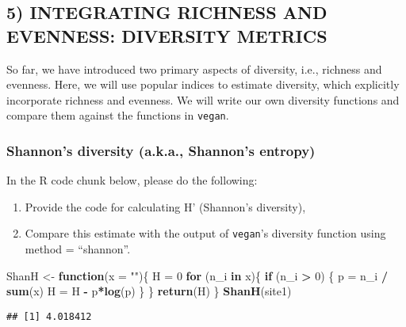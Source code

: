 \documentclass[
]{article}
\newenvironment{Shaded}{\begin{snugshade}}{\end{snugshade}}
\newcommand{\AttributeTok}[1]{\textcolor[rgb]{0.13,0.29,0.53}{#1}}
\newcommand{\ControlFlowTok}[1]{\textcolor[rgb]{0.13,0.29,0.53}{\textbf{#1}}}
\newcommand{\DecValTok}[1]{\textcolor[rgb]{0.00,0.00,0.81}{#1}}
\newcommand{\FunctionTok}[1]{\textcolor[rgb]{0.13,0.29,0.53}{\textbf{#1}}}
\newcommand{\NormalTok}[1]{#1}
\newcommand{\OtherTok}[1]{\textcolor[rgb]{0.56,0.35,0.01}{#1}}
\newcommand{\SpecialCharTok}[1]{\textcolor[rgb]{0.81,0.36,0.00}{\textbf{#1}}}
\newcommand{\StringTok}[1]{\textcolor[rgb]{0.31,0.60,0.02}{#1}}
\begin{document}
\subsection{5) INTEGRATING RICHNESS AND EVENNESS: DIVERSITY
METRICS}\label{integrating-richness-and-evenness-diversity-metrics}

So far, we have introduced two primary aspects of diversity, i.e.,
richness and evenness. Here, we will use popular indices to estimate
diversity, which explicitly incorporate richness and evenness. We will
write our own diversity functions and compare them against the functions
in \texttt{vegan}.

\subsubsection{Shannon's diversity (a.k.a., Shannon's
entropy)}\label{shannons-diversity-a.k.a.-shannons-entropy}

In the R code chunk below, please do the following:

\begin{enumerate}
\def\labelenumi{\arabic{enumi}.}
\item
  Provide the code for calculating H' (Shannon's diversity),
\item
  Compare this estimate with the output of \texttt{vegan}'s diversity
  function using method = ``shannon''.
\end{enumerate}

\begin{Shaded}
\begin{Highlighting}[]
\NormalTok{ShanH }\OtherTok{\textless{}{-}} \ControlFlowTok{function}\NormalTok{(}\AttributeTok{x =} \StringTok{""}\NormalTok{)\{}
\NormalTok{  H }\OtherTok{=} \DecValTok{0}
  \ControlFlowTok{for}\NormalTok{ (n\_i }\ControlFlowTok{in}\NormalTok{ x)\{}
    \ControlFlowTok{if}\NormalTok{ (n\_i }\SpecialCharTok{\textgreater{}} \DecValTok{0}\NormalTok{) \{}
\NormalTok{      p }\OtherTok{=}\NormalTok{ n\_i }\SpecialCharTok{/} \FunctionTok{sum}\NormalTok{(x)}
\NormalTok{      H }\OtherTok{=}\NormalTok{ H }\SpecialCharTok{{-}}\NormalTok{ p}\SpecialCharTok{*}\FunctionTok{log}\NormalTok{(p)}
\NormalTok{    \}}
\NormalTok{  \}}
  \FunctionTok{return}\NormalTok{(H)}
\NormalTok{\}}
\FunctionTok{ShanH}\NormalTok{(site1)}
\end{Highlighting}
\end{Shaded}

\begin{verbatim}
## [1] 4.018412
\end{verbatim}
\end{document}
